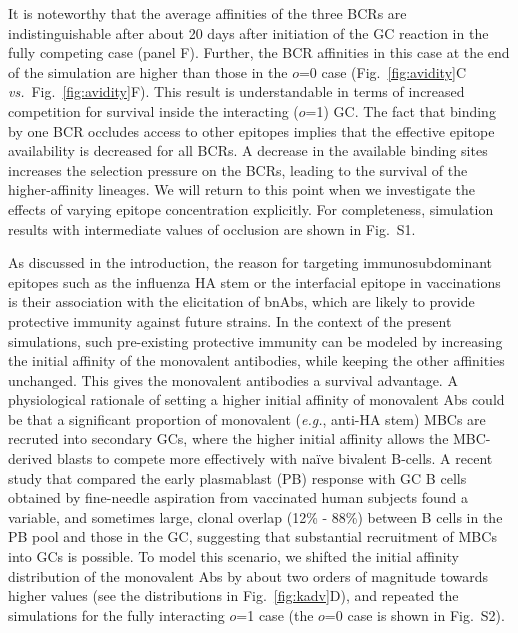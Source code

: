 \documentclass[utf8]{frontiersHLTH}%
\newcommand{\cred}[1]{#1} %
\def\eg {{\it e.g.}}
\def\vs {{\it vs.}}
\newcommand{\fig}[1]{Fig.~\ref{fig:#1}}
\newcommand{\occl}{o}
\begin{document}
It is noteworthy that the average affinities of the three BCRs are
indistinguishable after about 20 days after initiation of the GC reaction
in the fully competing case (panel F). Further, the BCR affinities in this
case at the end of the
simulation are higher than those in the $\occl$=0 case (\fig{avidity}C
\vs~\fig{avidity}F). This result is understandable in terms of increased
competition for survival inside the interacting ($\occl$=1) GC.  The fact
that binding by one BCR occludes access to other epitopes implies that
the effective epitope availability is decreased for all BCRs. 
A decrease in the available binding sites increases the
selection pressure on the BCRs, leading to the survival of the higher-affinity
lineages. We will return to this point when we investigate
the effects of varying epitope concentration explicitly. 
For completeness, simulation
results with intermediate values of occlusion are shown in Fig.~S1.

As discussed in the introduction, the reason for targeting immunosubdominant
epitopes such as the influenza HA stem or the interfacial
epitope\cite{watanabe19} in vaccinations is their association with the elicitation of bnAbs, which
are likely to provide protective immunity against future strains.
In the context of the present simulations,
such pre-existing protective immunity
can be modeled by increasing the initial affinity of the monovalent
antibodies, while keeping the other affinities unchanged.  This gives the
monovalent antibodies a survival advantage. A physiological
rationale of setting a higher initial affinity of monovalent Abs could
be that a significant proportion of monovalent (\eg, anti-HA stem) MBCs are recruted into secondary
GCs, where the higher initial affinity allows the MBC-derived blasts to compete more effectively with na\"ive bivalent B-cells.
%
\cred{A recent study that compared the early plasmablast (PB) response with GC
B cells obtained by fine-needle aspiration from vaccinated human subjects found a variable, and sometimes large, clonal overlap
(12\% - 88\%) between B cells in the PB pool and those in the GC, suggesting that substantial 
recruitment of MBCs into GCs is possible.\cite{turner20}}
%
To model this scenario, we shifted the initial affinity distribution of the
monovalent Abs
by about two orders of magnitude towards higher values
(see the distributions in \fig{kadv}D), and repeated the simulations for the
fully interacting $\occl$=1 case (the $\occl$=0 case is shown in Fig.~S2).
\end{document}

